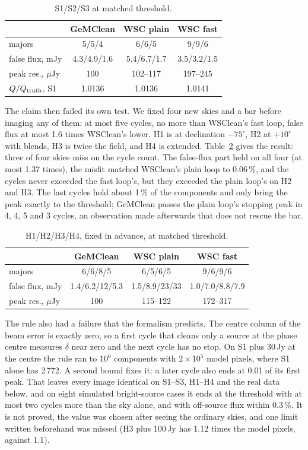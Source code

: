 \documentclass[twocolumn,10pt]{article}
\theoremstyle{remark}
\begin{document}
\begin{table}
\centering
\caption{S1/S2/S3 at matched threshold.}
\label{tab:sims}
\footnotesize
\begin{tabular}{@{}lccc@{}}
\toprule
 & GeMClean & WSC plain & WSC fast\\
\midrule
majors & 5/5/4 & 6/6/5 & 9/9/6\\
false flux, mJy & 4.3/4.9/1.6 & 5.4/6.7/1.7 & 3.5/3.2/1.5\\
peak res., $\mu$Jy & 100 & 102--117 & 197--245\\
$Q/Q_{\rm truth}$, S1 & 1.0136 & 1.0136 & 1.0141\\
\bottomrule
\end{tabular}
\end{table}

The claim then failed its own test. We fixed four new skies and a bar before imaging any of them: at most five cycles, no more than WSClean's fast loop, false flux at most 1.6 times WSClean's lower. H1 is at declination $-75^\circ$, H2 at $+10^\circ$ with blends, H3 is twice the field, and H4 is extended. Table~\ref{tab:heldout} gives the result: three of four skies miss on the cycle count. The false-flux part held on all four (at most 1.37 times), the misfit matched WSClean's plain loop to 0.06\,\%, and the cycles never exceeded the fast loop's, but they exceeded the plain loop's on H2 and H3. The last cycles hold about 1\,\% of the components and only bring the peak exactly to the threshold; GeMClean passes the plain loop's stopping peak in 4, 4, 5 and 3 cycles, an observation made afterwards that does not rescue the bar.

\begin{table}
\centering
\caption{H1/H2/H3/H4, fixed in advance, at matched threshold.}
\label{tab:heldout}
\footnotesize
\setlength{\tabcolsep}{3pt}
\begin{tabular}{@{}lccc@{}}
\toprule
 & GeMClean & WSC plain & WSC fast\\
\midrule
majors & 6/6/8/5 & 6/5/6/5 & 9/6/9/6\\
false flux, mJy & 1.4/6.2/12/5.3 & 1.5/8.9/23/33 & 1.0/7.0/8.8/7.9\\
peak res., $\mu$Jy & 100 & 115--122 & 172--317\\
\bottomrule
\end{tabular}
\end{table}

The rule also had a failure that the formalism predicts. The centre column of the beam error is exactly zero, so a first cycle that cleans only a source at the phase centre measures $\delta$ near zero and the next cycle has no stop. On S1 plus 30\,Jy at the centre the rule ran to $10^6$ components with $2\times10^5$ model pixels, where S1 alone has 2\,772. A second bound fixes it: a later cycle also ends at 0.01 of its first peak. That leaves every image identical on S1--S3, H1--H4 and the real data below, and on eight simulated bright-source cases it ends at the threshold with at most two cycles more than the sky alone, and with off-source flux within 0.3\,\%. It is not proved, the value was chosen after seeing the ordinary skies, and one limit written beforehand was missed (H3 plus 100\,Jy has 1.12 times the model pixels, against 1.1).
\end{document}
